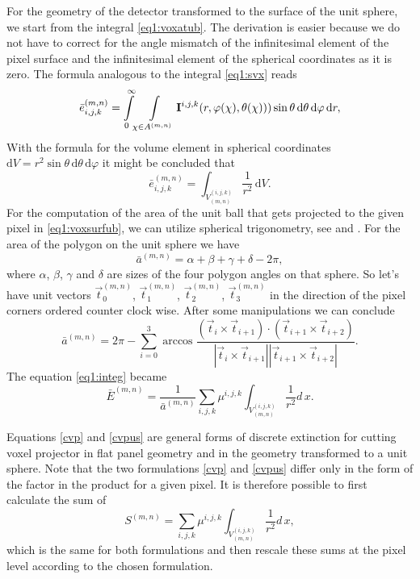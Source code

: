 For the geometry of the detector transformed to the surface of the unit sphere, we start from the integral \eqref{eq1:voxatub}. The derivation is easier because we do not have to correct for the angle mismatch of the infinitesimal element of the pixel surface and the infinitesimal element of the spherical coordinates as it is zero. The formula analogous to the integral \eqref{eq1:svx} reads
\begin{equation}
     \bar{e}_{i,j,k}^{(m,n)} = \int\limits_0^\infty \!  \int\limits_{\chi \in A^{(m,n)}} \mathbf{I}^{i,j,k}(r, \varphi(\chi), \theta(\chi)))  \sin{\theta} \,\mathrm{d}\theta \,\mathrm{d}\varphi \, \mathrm{d} r,
\end{equation}
With the formula for the volume element in spherical coordinates $\mathrm{d}V = r^2 \sin{\theta} \,\mathrm{d}\theta \,\mathrm{d}\varphi $ it might be concluded that
\begin{equation}
     \bar{e}_{i,j,k}^{(m,n)} =  \int_{V^{(i,j,k)}_{(m,n)}}  \frac{1}{r^2}  \,\mathrm{d}V. \label{eq1:intcut}
\end{equation}
For the computation of the area of the unit ball that gets projected to the given pixel in \eqref{eq1:voxsurfub}, we can utilize spherical trigonometry, see \cite{3540309} and \cite[p. 98-99]{Todhunter1914}. For the area of the polygon on the unit sphere we have
\begin{equation}
    \bar{a}^{(m,n)} = \alpha + \beta + \gamma + \delta - 2 \pi,  
\end{equation}
where $\alpha$, $\beta$, $\gamma$ and $\delta$ are sizes of the four polygon angles on that sphere. So let's have unit vectors $\vec{t}_0^{(m,n)}$, $\vec{t}_1^{(m,n)}$, $\vec{t}_2^{(m,n)}$, $\vec{t}_3^{(m,n)}$ in the direction of the pixel corners ordered counter clock wise. After some manipulations we can conclude
\begin{equation}
    \bar{a}^{(m,n)} = 2 \pi - \sum_{i=0}^3 \arccos{ \frac{(\vec{t}_i \times \vec{t}_{i+1})\cdot(\vec{t}_{i+1} \times \vec{t}_{i+2})}{|\vec{t}_i \times \vec{t}_{i+1}||\vec{t}_{i+1} \times \vec{t}_{i+2}|}}. 
\end{equation}
The equation \eqref{eq1:integ} became
\begin{equation}
    \bar{E}^{(m,n)} = \frac{1}{\bar{a}^{(m,n)}} \sum_{i,j,k} \mu^{i,j,k} \int_{V^{(i,j,k)}_{(m,n)}}  \frac{1}{r^2} d\,x. \label{cvpus}
\end{equation}

Equations \eqref{cvp} and \eqref{cvpus} are general forms of discrete extinction for cutting voxel projector in flat panel geometry and in the geometry transformed to a unit sphere. Note that the two formulations \eqref{cvp} and \eqref{cvpus} differ only in the form of the factor in the product for a given pixel. It is therefore possible to first calculate the sum of
\begin{equation}
    S^{(m,n)} = \sum_{i,j,k} \mu^{i,j,k} \int_{V^{(i,j,k)}_{(m,n)}}  \frac{1}{r^2} d\,x, \label{cvpsu}
\end{equation}
which is the same for both formulations and then rescale these sums at the pixel level according to the chosen formulation. 

